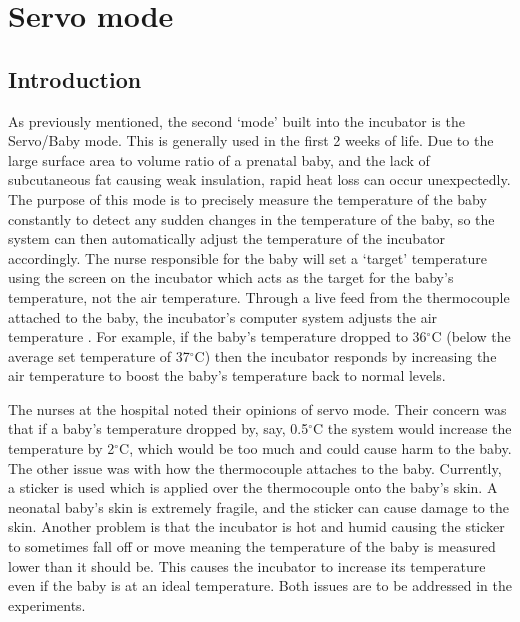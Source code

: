 \documentclass{article}
\begin{document}
\section{Servo mode}
\subsection{Introduction}
\vspace{3mm}
As previously mentioned, the second ‘mode’ built into the incubator is the Servo/Baby mode. This is generally used in the first 2 weeks of life. Due to the large surface area to volume ratio of a prenatal baby, and the lack of subcutaneous fat causing weak insulation, rapid heat loss can occur unexpectedly. The purpose of this mode is to precisely measure the temperature of the baby constantly to detect any sudden changes in the temperature of the baby, so the system can then automatically adjust the temperature of the incubator accordingly. The nurse responsible for the baby will set a ‘target’ temperature using the screen on the incubator which acts as the target for the baby’s temperature, not the air temperature. Through a live feed from the thermocouple attached to the baby, the incubator's computer system adjusts the air temperature \cite{LS1}. For example, if the baby’s temperature dropped to 36$^{\circ}$C (below the average set temperature of 37$^{\circ}$C) then the incubator responds by increasing the air temperature to boost the baby’s temperature back to normal levels. 
 
 \vspace{3mm}
 
The nurses at the hospital noted their opinions of servo mode. Their concern was that if a baby’s temperature dropped by, say, 0.5$^{\circ}$C the system would increase the temperature by 2$^{\circ}$C, which would be too much and could cause harm to the baby. The other issue was with how the thermocouple attaches to the baby. Currently, a sticker is used which is applied over the thermocouple onto the baby’s skin. A neonatal baby’s skin is extremely fragile, and the sticker can cause damage to the skin. Another problem is that the incubator is hot and humid causing the sticker to sometimes fall off or move meaning the temperature of the baby is measured lower than it should be. This causes the incubator to increase its temperature even if the baby is at an ideal temperature. Both issues are to be addressed in the experiments. 
 
 \vspace{3mm}
 
\end{document}
